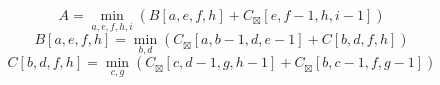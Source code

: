 \documentclass{article}
\begin{document}
$$ A =\min_{ a,e,f,h,i } \left( B\left[a,e,f,h\right]+C_{\boxtimes}\left[e,f-1,h,i-1\right]\right) $$
$$ B\left[ a,e,f,h \right] =\min_{ b,d } \left( C_{\boxtimes}\left[a,b-1,d,e-1\right]+C\left[b,d,f,h\right]\right) $$
$$ C\left[ b,d,f,h \right] =\min_{ c,g } \left( C_{\boxtimes}\left[c,d-1,g,h-1\right]+C_{\boxtimes}\left[b,c-1,f,g-1\right]\right) $$
\end{document}
